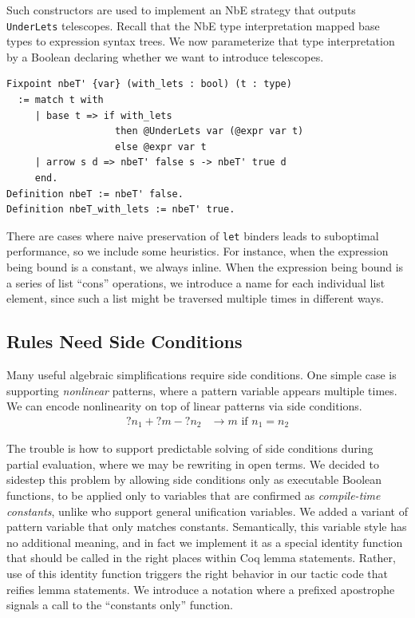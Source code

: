 Such constructors are used to implement an NbE strategy that outputs \texttt{UnderLets} telescopes.
Recall that the NbE type interpretation mapped base types to expression syntax trees.
We now parameterize that type interpretation by a Boolean declaring whether we want to introduce telescopes.

\begin{verbatim}
Fixpoint nbeT' {var} (with_lets : bool) (t : type)
  := match t with
     | base t => if with_lets
                   then @UnderLets var (@expr var t)
                   else @expr var t
     | arrow s d => nbeT' false s -> nbeT' true d
     end.
Definition nbeT := nbeT' false.
Definition nbeT_with_lets := nbeT' true.
\end{verbatim}


There are cases where naive preservation of \texttt{let} binders leads to suboptimal performance, so we include some heuristics.
For instance, when the expression being bound is a constant, we always inline.
When the expression being bound is a series of list ``cons'' operations, we introduce a name for each individual list element, since such a list might be traversed multiple times in different ways.

\subsection{Rules Need Side Conditions} \label{sec:side-conditions}

Many useful algebraic simplifications require side conditions.
One simple case is supporting \emph{nonlinear} patterns, where a pattern variable appears multiple times.
We can encode nonlinearity on top of linear patterns via side conditions.
\begin{align*}
  ?n_1 + ?m - ?n_2 & \to m\text{ if }n_1 = n_2
\end{align*}

The trouble is how to support predictable solving of side conditions during partial evaluation, where we may be rewriting in open terms.
We decided to sidestep this problem by allowing side conditions only as executable Boolean functions, to be applied only to variables that are confirmed as \emph{compile-time constants}, unlike \textcite{rtac} who support general unification variables.
We added a variant of pattern variable that only matches constants.
Semantically, this variable style has no additional meaning, and in fact we implement it as a special identity function that should be called in the right places within Coq lemma statements.
Rather, use of this identity function triggers the right behavior in our tactic code that reifies lemma statements.
We introduce a notation where a prefixed apostrophe signals a call to the ``constants only'' function.

